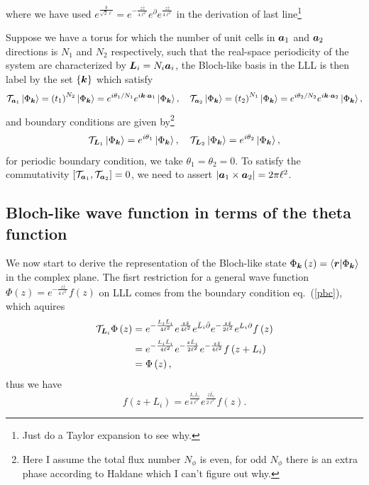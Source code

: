 \documentclass[%
nofootinbib,
 amsmath,amssymb,
 aps,onecolumn,
prb
]{revtex4-2}
\newcommand{\zz}{\bar{z}}
\newcommand{\mT}{\mathcal{T}}
\begin{document}
where we have used $e^{\frac{b}{\sqrt{2}\ell}}=e^{-\frac{z\zz}{4\ell^2}}e^{\partial}e^{\frac{z\zz}{4\ell^2}}$ in the derivation of last line\footnote{Just do a Taylor expansion to see why.}\par
Suppose we have a torus for which the number of unit cells in $\vb*{a}_1$ and $\vb*{a}_2$ directions is $N_1$ and $N_2$ respectively, such that the real-space periodicity of the system are characterized by $\vb*{L}_i = N_i\vb*{a}_i$,
the Bloch-like basis in the LLL is then label by the set %
$\{\vb*{k}\}$ which satisfy
\begin{equation}\label{bloch_basis}
    \mT_{\vb*{a}_1}\ket{\Phi_{\vb*{k}}}=\left(t_1\right)^{N_2}\ket{\Phi_{\vb*{k}}}=e^{i\theta_1/N_1}e^{i\vb*{k}\cdot\vb*{a}_1}\ket{\Phi_{\vb*{k}}},\quad 
    \mT_{\vb*{a}_2}\ket{\Phi_{\vb*{k}}}=\left(t_2\right)^{N_1}\ket{\Phi_{\vb*{k}}}=e^{i\theta_2/N_2}e^{i\vb*{k}\cdot\vb*{a}_2}\ket{\Phi_{\vb*{k}}},
\end{equation}
and boundary conditions are given by\footnote{Here I assume the total flux number $N_\phi$ is even, for odd $N_\phi$ there is an extra phase according to Haldane which I can't figure out why.}
\begin{equation}\label{pbc}
    \mT_{\vb*{L}_1}\ket{\Phi_{\vb*{k}}}=e^{i\theta_1}\ket{\Phi_{\vb*{k}}},\quad
    \mT_{\vb*{L}_2}\ket{\Phi_{\vb*{k}}}=e^{i\theta_2}\ket{\Phi_{\vb*{k}}},
\end{equation}
for periodic boundary condition, we take $\theta_1=\theta_2=0$. To satisfy the commutativity $[\mT_{\vb*{a}_1},\mT_{\vb*{a}_2}]=0$, we need to assert $|\vb*{a}_1\times\vb*{a}_2|=2\pi\ell^2$.
\subsection{Bloch-like wave function in terms of the theta function}
We now start to derive the representation of the Bloch-like state $\Phi_{\vb*{k}}\left(z\right)=\braket{\vb*{r}}{\Phi_{\vb*{k}}}$ in the complex plane. The fisrt restriction for 
a general wave function $\Phi\left(z\right)=e^{-\frac{z\zz}{4\ell^2}}f\left(z\right)$ on LLL comes from the boundary condition eq.~(\ref{pbc}), which aquires
\begin{align}
    \mT_{\vb*{L}_i}\Phi\left(z\right)&=e^{-\frac{L_i\bar{L}_i}{4\ell^2}}e^{\frac{z\zz}{4\ell^2}}e^{\bar{L}_i \bar{\partial}}e^{-\frac{z\zz}{2\ell^2}}e^{L_i\partial}f\left(z\right)\nonumber\\
    &=e^{-\frac{L_i\bar{L}_i}{4\ell^2}}e^{-\frac{z\bar{L}_i}{2\ell^2}}e^{-\frac{z\zz}{4\ell^2}}f\left(z+L_i\right)\nonumber\\ 
    &=\Phi\left(z\right),
\end{align}
thus we have 
\begin{equation}\label{boundaryconditionofF}
    f\left(z+L_i\right)=e^{\frac{L_i\bar{L}_i}{4\ell^2}}e^{\frac{z\bar{L}_i}{2\ell^2}}f\left(z\right).
\end{equation}
\end{document}
